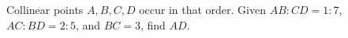 Collinear points $A,B,C,D$ occur in that order. Given $AB:CD=1:7$, $AC:BD=2:5$, and $BC=3$, find $AD$.
